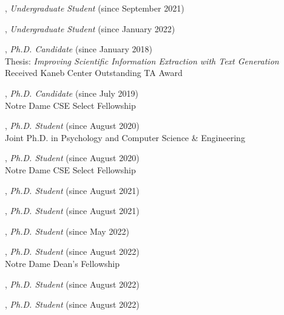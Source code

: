 \documentclass[10pt]{article}
\newenvironment{myindentpar}[1]%
{\begin{list}{}%
         {\setlength{\leftmargin}{#1}}%
         \item[]%
}
{\end{list}}
\newcounter{list}
\begin{document}
\begin{myindentpar}{0.75cm}

\hspace{-0.75cm}{\bf Yunxiang (Ryan) Yan}, \textit{Undergraduate Student} (since September 2021)

\hspace{-0.75cm}{\bf Weike Fang}, \textit{Undergraduate Student} (since January 2022)

\hspace{-0.75cm}{\bf Qingkai Zeng}, \textit{Ph.D. Candidate} (since January 2018) \\
	{Thesis: \textit{Improving Scientific Information Extraction with Text Generation}} \\
	{Received Kaneb Center Outstanding TA Award}

\hspace{-0.75cm}{\bf Wenhao Yu}, \textit{Ph.D. Candidate} (since July 2019) \\
	{Notre Dame CSE Select Fellowship}

\hspace{-0.75cm}{\bf Ms. Lingbo Tong}, \textit{Ph.D. Student} (since August 2020) \\
	{Joint Ph.D. in Psychology and Computer Science \& Engineering}

\hspace{-0.75cm}{\bf Ms. Mengxia Yu}, \textit{Ph.D. Student} (since August 2020) \\
	{Notre Dame CSE Select Fellowship}

\hspace{-0.75cm}{\bf Gang Liu}, \textit{Ph.D. Student} (since August 2021)

\hspace{-0.75cm}{\bf Zhihan Zhang}, \textit{Ph.D. Student} (since August 2021)

\hspace{-0.75cm}{\bf Noah Ziems}, \textit{Ph.D. Student} (since May 2022)

\hspace{-0.75cm}{\bf Eric Inae}, \textit{Ph.D. Student} (since August 2022) \\
	{Notre Dame Dean's Fellowship}

\hspace{-0.75cm}{\bf Hy Dang}, \textit{Ph.D. Student} (since August 2022)

\hspace{-0.75cm}{\bf Ms. Nandini Banerjee}, \textit{Ph.D. Student} (since August 2022)

\end{myindentpar}
\end{document}
